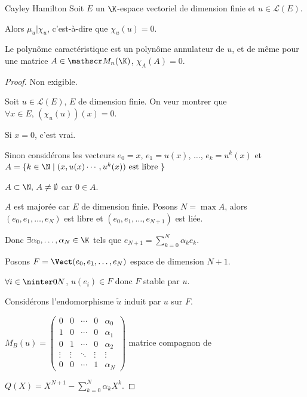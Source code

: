\begin{theoreme}{Cayley Hamilton}{}
    Soit $E$ un $\K$-espace vectoriel de dimension finie et $u \in \mathscr L(E)$.

    Alors $\mu_u | \chi_u$, c'est-à-dire que $\chi_u(u) = 0$. 

    Le polynôme caractéristique est un polynôme annulateur de $u$, et de même 
    pour une matrice $A \in \mathscr M_n(\K)$, $\chi_A(A) = 0$.
\end{theoreme}


\begin{proof}
    Non exigible.

    Soit $u \in \mathscr L(E)$, $E$ de dimension finie. On veur montrer que 
    $\forall x \in E, \, (\chi_u(u))(x) = 0$.

    Si $x = 0$, c'est vrai. 

    Sinon considérons les vecteurs $e_0 = x$, $e_1 = u(x)$, $\ldots$, $e_k = u^k(x)$ 
    et $A = \{k \in \N \mid (x, u(x) \cdots, u^k(x)) \text{ est libre }\}$

    $A \subset \N, \, A \neq \emptyset$ car $0 \in A$.

    $A$ est majorée car $E$ de dimension finie. Posons $N = \max A$, alors $(e_0, e_1, \ldots, e_N)$ est libre et
    $(e_0, e_1, \ldots, e_{N + 1})$ est liée.

    Donc $\exists \alpha_0, \ldots, \alpha_N \in \K$ tels que
    $e_{N + 1} = \sum_{k = 0 }^{ N } \alpha_k e_k$.

    Posons $F = \Vect(e_0, e_1, \ldots, e_N)$ espace de dimension $N + 1$. 

    $\forall i \in \ninter 0 N$, $u(e_i) \in F$ donc $F$ stable par $u$.

    Considérons l'endomorphisme $\tilde u $ induit par $u$ sur $F$.

    $M_B(u) = \begin{pmatrix}
        0 & 0 & \cdots & 0 & \alpha_0 \\
        1 & 0 & \cdots & 0 & \alpha_1 \\
        0 & 1 & \cdots & 0 & \alpha_2 \\
        \vdots & \vdots & \ddots & \vdots & \vdots \\
        0 & 0 & \cdots & 1 & \alpha_N
    \end{pmatrix}$ matrice compagnon de 
    
    $\displaystyle Q(X) = X^{N + 1} - \sum_{k = 0 }^{ N } \alpha_k X^k$.


\end{proof}
